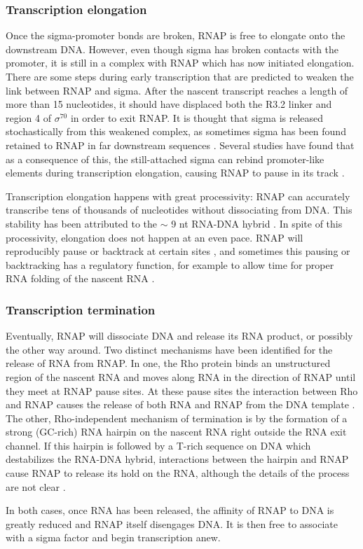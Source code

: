 \subsubsection{Transcription elongation}
Once the sigma-promoter bonds are broken, RNAP is free to elongate onto the
downstream DNA. However, even though sigma has broken contacts with the
promoter, it is still in a complex with RNAP which has now initiated
elongation. There are some steps during early transcription that are predicted
to weaken the link between RNAP and sigma. After the nascent transcript reaches
a length of more than 15 nucleotides, it should have displaced both the R3.2
linker and region 4 of $\sigma^{70}$ \cite{mekler_structural_2002,
nickels_interaction_2005} in order to exit RNAP. It is thought that sigma is
released stochastically from this weakened complex, as sometimes sigma has been
found retained to RNAP in far downstream sequences \cite{mooney_sigma_2005}.
Several studies have found that as a consequence of this, the still-attached
sigma can rebind promoter-like elements during transcription elongation,
causing RNAP to pause in its track \cite{ring_function_1996, kapanidis_retention_2005,
raffaelle_holoenzyme_2005}.

Transcription elongation happens with great processivity: RNAP can accurately
transcribe tens of thousands of nucleotides without dissociating from DNA. This
stability has been attributed to the $\sim$ 9 nt RNA-DNA hybrid
\cite{nudler_rna-dna_1997}. In spite of this processivity, elongation does not
happen at an even pace. RNAP will reproducibly pause or backtrack at certain
sites \cite{herbert_sequence-resolved_2006}, and sometimes this pausing or
backtracking has a regulatory function, for example to allow time for proper
RNA folding of the nascent RNA \cite{landick_r_regulatory_2006}.

\subsubsection{Transcription termination}
Eventually, RNAP will dissociate DNA and release its RNA product, or possibly
the other way around. Two distinct mechanisms have been identified for the
release of RNA from RNAP. In one, the Rho protein binds an unstructured region
of the nascent RNA and moves along RNA in the direction of RNAP until they meet
at RNAP pause sites. At these pause sites the interaction between Rho and RNAP
causes the release of both RNA and RNAP from the DNA template
\cite{ciampi_rho-dependent_2006}. The other, Rho-independent mechanism of
termination is by the formation of a strong (GC-rich) RNA hairpin on the
nascent RNA right outside the RNA exit channel. If this hairpin is followed by
a T-rich sequence on DNA which destabilizes the RNA-DNA hybrid, interactions
between the hairpin and RNAP cause RNAP to release its hold on the RNA,
although the details of the process are not clear
\cite{nudler_transcription_2002}.

In both cases, once RNA has been released, the affinity of RNAP to DNA is
greatly reduced and RNAP itself disengages DNA. It is then free to associate
with a sigma factor and begin transcription anew.
